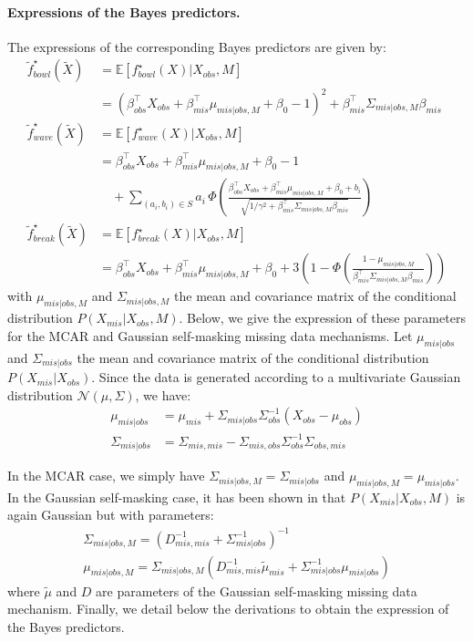 \documentclass{article}
\newcommand{\E}{\mathbb{E}}
\newcommand{\Ncal}{\mathcal{N}}
\newcommand{\tmu}{\widetilde{\mu}}
\newcommand{\br}[1]{\left(#1\right)}
\newcommand{\sqb}[1]{\left[#1\right]}
\theoremstyle{plain}
\begin{document}
\paragraph{Expressions of the Bayes predictors.}
The expressions of the corresponding Bayes predictors are given by:
\begin{align}
    \tilde f^\star_{bowl}(\widetilde X) &= \E \sqb{f^\star_{bowl}(X) | X_{obs}, M}\\
    &= \br{\beta_{obs}^\top X_{obs} + \beta_{mis}^\top \mu_{mis|obs, M} + \beta_0 - 1}^2 + \beta_{mis}^\top \Sigma_{mis|obs, M} \beta_{mis}\\[1em]
    \tilde f^\star_{wave}(\widetilde X) &= \E \sqb{f^\star_{wave}(X) | X_{obs}, M}\\
    &= \beta_{obs}^\top X_{obs} + \beta_{mis}^\top \mu_{mis|obs, M} + \beta_0 - 1\\
    & \quad + \sum_{(a_i, b_i) \in S} a_i\,\Phi\br{\frac{\beta_{obs}^\top X_{obs} + \beta_{mis}^\top \mu_{mis|obs, M} + \beta_0 + b_i}{\sqrt{1/\gamma^2 + \beta_{mis}^\top \Sigma_{mis|obs, M} \beta_{mis}}}}\\[1em]
    \tilde f^\star_{break}(\widetilde X) &= \E \sqb{f^\star_{break}(X) | X_{obs}, M}\\
    &= \beta_{obs}^\top X_{obs} + \beta_{mis}^\top \mu_{mis|obs, M} + \beta_0 + 3\br{1-\Phi\br{\frac{1-\mu_{mis|obs, M}}{\beta_{mis}^\top \Sigma_{mis|obs, M} \beta_{mis}}}}
\end{align}
with $\mu_{mis|obs, M}$ and $\Sigma_{mis|obs, M}$ the mean and covariance matrix of the conditional distribution $P(X_{mis}|X_{obs}, M)$. Below, we give the expression of these parameters for the MCAR and Gaussian self-masking missing data mechanisms. Let $\mu_{mis|obs}$ and $\Sigma_{mis|obs}$ the mean and covariance matrix of the conditional distribution $P(X_{mis}|X_{obs})$. Since the data is generated according to a multivariate Gaussian distribution $\Ncal \br{\mu, \Sigma}$, we have:
\begin{align*}
    \mu_{mis|obs} &= \mu_{mis} + \Sigma_{mis|obs} \Sigma_{obs}^{-1}(X_{obs} - \mu_{obs})\\
    \Sigma_{mis|obs} &= \Sigma_{mis, mis} - \Sigma_{mis, obs} \Sigma_{obs}^{-1} \Sigma_{obs, mis}
\end{align*}

In the MCAR case, we simply have $\Sigma_{mis|obs, M} = \Sigma_{mis|obs}$ and $\mu_{mis|obs, M} = \mu_{mis|obs}$. In the Gaussian self-masking case, it has been shown in \cite{LeMorvan2020NeuMiss} that $P(X_{mis}|X_{obs}, M)$ is again Gaussian but with parameters:
\begin{align*}
    \Sigma_{mis|obs, M} = \br{D_{mis, mis}^{-1} + \Sigma_{mis|obs}^{-1}}^{-1} \\
    \mu_{mis|obs, M} = \Sigma_{mis|obs, M} \br{D_{mis, mis}^{-1}\tmu_{mis} + \Sigma_{mis|obs}^{-1}\mu_{mis|obs}}
\end{align*}
where $\tilde \mu$ and $D$ are parameters of the Gaussian self-masking missing data mechanism. Finally, we detail below the derivations to obtain the expression of the Bayes predictors.
\end{document}
